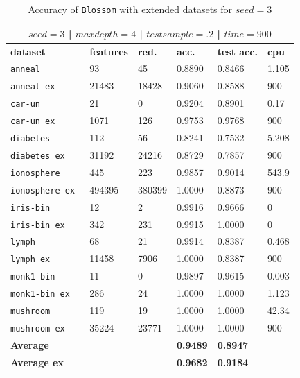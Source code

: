 \documentclass[12pt]{report}
\theoremstyle{definition}
\theoremstyle{definition}
\theoremstyle{definition}
\begin{document}
\begin{table}[ht]
    \centering
    \begin{tabular}{L{3.5cm} R{1.8cm} R{1.8cm} R{1.8cm} R{1.8cm} R{1.8cm}}
        \hline
         \\
        \hline
        \bf dataset & \bf features & \bf red. & \bf acc. & \bf test acc. & \bf cpu \\
        \hline
        \tt anneal & 93 & 45 & 0.8890 & 0.8466 & 1.105 \\
        \tt anneal ex & 21483 & 18428 & 0.9060 & 0.8588 & 900 \\
        \tt car-un & 21 & 0 & 0.9204 & 0.8901 & 0.17 \\
        \tt car-un ex & 1071 & 126 & 0.9753 & 0.9768 & 900 \\
        \tt diabetes & 112 & 56 & 0.8241 & 0.7532 & 5.208 \\
        \tt diabetes ex & 31192 & 24216 & 0.8729 & 0.7857 & 900 \\
        \tt ionosphere & 445 & 223 & 0.9857 & 0.9014 & 543.9 \\
        \tt ionosphere ex & 494395 & 380399 & 1.0000 & 0.8873 & 900 \\
        \tt iris-bin & 12 & 2 & 0.9916 & 0.9666 & 0 \\
        \tt iris-bin ex & 342 & 231 & 0.9915 & 1.0000 & 0 \\
        \tt lymph & 68 & 21 & 0.9914 & 0.8387 & 0.468 \\
        \tt lymph ex & 11458 & 7906 & 1.0000 & 0.8387 & 900 \\
        \tt monk1-bin & 11 & 0 & 0.9897 & 0.9615 & 0.003 \\
        \tt monk1-bin ex & 286 & 24 & 1.0000 & 1.0000 & 1.123 \\
        \tt mushroom & 119 & 19 & 1.0000 & 1.0000 & 42.34 \\
        \tt mushroom ex & 35224 & 23771 & 1.0000 & 1.0000 & 900 \\
        \hline
        \bf Average & & & \bf 0.9489 & \bf 0.8947 & \\
        \hline
        \bf Average ex & & & \bf 0.9682 & \bf 0.9184 & \\
        \hline
    \end{tabular}
    \caption{Accuracy of \texttt{Blossom} with extended datasets for $seed=3$}
    \label{fig:seed3}
\end{table}
\end{document}
